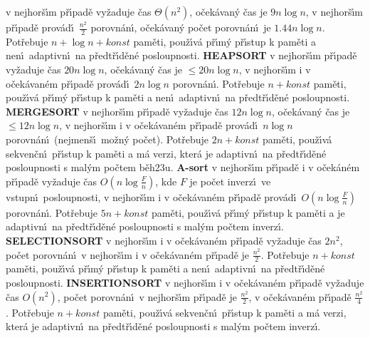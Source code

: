 \documentclass[a4paper,12pt]{article}
\begin{document}
 v nejhor\v s\'\i m p\v r\'\i pad\v e vy\v zaduje \v cas 
$\Theta (n^2)$, o\v ce\-k\'avan\'y \v cas je $9n\log n$, v 
nej\-hor\v s\'\i m p\v r\'\i pad\v e prov\'ad\'\i\ $\frac {n^2}2$ porov\-n\'an\'\i ,  
o\v cek\'avan\'y po\v cet porov\-n\'an\'\i\ je $1.44n\log n$. 
Pot\v rebuje $n+\log n+konst$ pam\v eti, pou\v z\'\i v\'a p\v r\'\i m\'y 
p\v r\'\i stup k pam\v eti a nen\'\i\ adaptivn\'\i\ na p\v redt\v r\'\i d\v en\'e 
posloupnosti.\newline 
{\bf HEAPSORT} v nejhor\v s\'\i m p\v r\'\i pad\v e vy\v zaduje \v cas $
20n\log n$, 
o\v ce\-k\'avan\'y \v cas je $\le 20n\log n$, v nejhor\v s\'\i m i v 
o\v cek\'avan\'em p\v r\'\i pad\v e prov\'ad\'\i\ $2n\log n$ porovn\'an\'\i . 
Pot\v rebuje $n+konst$ pam\v eti, pou\v z\'\i v\'a p\v r\'\i m\'y p\v r\'\i stup k pam\v eti a 
nen\'\i\ adaptivn\'\i\ na p\v redt\v r\'\i d\v en\'e posloupnosti.\newline 
{\bf MERGESORT} v nejhor\v s\'\i m p\v r\'\i pad\v e vy\v zaduje \v cas 
$12n\log n$, o\v cek\'avan\'y \v cas je $\le 12n\log n$, v nejhor\v s\'\i m 
i v o\v cek\'ava\-n\'em p\v r\'\i pad\v e prov\'ad\'\i\ $n\log n$ 
porovn\'an\'\i\ (nejmen\v s\'\i\ mo\v zn\'y po\v cet). Pot\v rebuje $
2n+konst$ 
pam\v eti, pou\v z\'\i v\'a 
sekven\v cn\'\i\ p\v r\'\i stup k pam\v eti a m\'a verzi, kter\'a je 
adaptivn\'\i\ na p\v redt\v r\'\i d\v en\'e posloupnosti s mal\'ym po\v ctem 
b\v eh\accent23u.\newline 
{\bf A-sort} v nejhor\v s\'\i m p\v r\'\i pad\v e i v o\v cek\'an\'em p\v r\'\i pad\v e vy\v zaduje \v cas 
$O(n\log\frac Fn)$, kde $F$ je po\v cet inverz\'\i\ ve vstupn\'\i\ 
posloupnosti,  v nejhor\v s\'\i m i v o\v cek\'avan\'em 
p\v r\'\i pad\v e prov\'ad\'\i\ $O(n\log\frac Fn)$ porovn\'an\'\i . Pot\v rebuje  
$5n+konst$ pam\v eti, pou\v z\'\i v\'a p\v r\'\i m\'y p\v r\'\i stup k pam\v eti 
a je adaptivn\'\i\ na p\v redt\v r\'\i d\v en\'e posloupnosti s mal\'ym 
po\v ctem inverz\'\i .\newline 
{\bf SELECTIONSORT} v nejhor\v s\'\i m i v o\v cek\'avan\'em p\v r\'\i pad\v e 
vy\v zaduje \v cas $2n^2$, po\v cet porov\-n\'an\'\i\ v nejhor\v s\'\i m 
i v o\v cek\'avan\'em p\v r\'\i pad\v e je $\frac {n^2}2$. Pot\v rebuje 
$n+konst$ pam\v eti, pou\v z\'\i v\'a p\v r\'\i m\'y p\v r\'\i stup k pam\v eti a 
nen\'\i\ adaptivn\'\i\ na p\v redt\v r\'\i d\v en\'e posloupnosti.\newline 
{\bf INSERTIONSORT} v nejhor\v s\'\i m i v o\v cek\'avan\'em p\v r\'\i pad\v e  
vy\-\v zaduje \v cas $O(n^2)$, po\v cet porov\-n\'an\'\i\ v nejhor\v s\'\i m 
p\v r\'\i pad\v e je $\frac {n^2}2$, v o\v ce\-k\'a\-van\'em p\v r\'\i pad\v e 
$\frac {n^2}4$. Pot\v rebuje $n+konst$ pam\v eti, pou\v z\'\i\-v\'a 
sekven\v cn\'\i\ p\v r\'\i stup k pam\v eti a m\'a verzi, kter\'a je 
adaptivn\'\i\ na p\v redt\v r\'\i d\v en\'e posloupnosti s mal\'ym po\v ctem 
inverz\'\i .
\medskip
\end{document}
